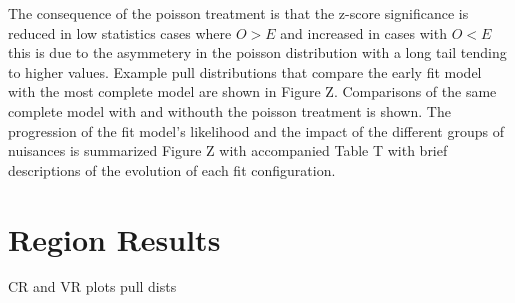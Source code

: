 The consequence of the poisson treatment is that the z-score significance is reduced in low statistics cases where $O>E$ and increased in cases with $O<E$ this is due to the asymmetery in the poisson distribution with a long tail tending to higher values. Example pull distributions that compare the early fit model with the most complete model are shown in Figure Z. Comparisons of the same complete model with and withouth the poisson treatment is shown. The progression of the fit model's likelihood and the impact of the different groups of nuisances is summarized Figure Z with accompanied Table T with brief descriptions of the evolution of each fit configuration. 
 
 




\section{Region Results}

CR and VR plots 
pull dists

